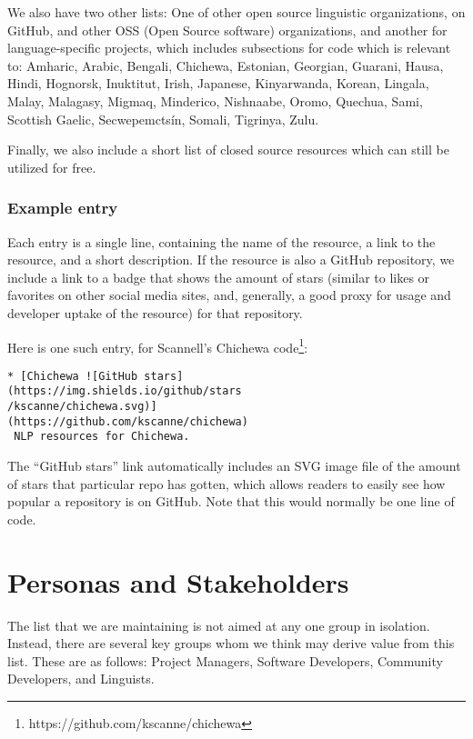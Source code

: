 \documentclass[10pt, a4paper]{article}
\begin{document}
We also have two other lists: One of other open source linguistic organizations, on GitHub, and other OSS (Open Source software) organizations, and another for language-specific projects, which includes subsections for code which is relevant to: Amharic, Arabic, Bengali, Chichewa, Estonian, Georgian, Guarani, Hausa, Hindi, Hognorsk, Inuktitut, Irish, Japanese, Kinyarwanda, Korean, Lingala, Malay, Malagasy, Migmaq, Minderico, Nishnaabe, Oromo, Quechua, Sami, Scottish Gaelic, Secwepemcts\'in, Somali, Tigrinya, Zulu.

Finally, we also include a short list of closed source resources which can still be utilized for free. 

\subsubsection{Example entry}

Each entry is a single line, containing the name of the resource, a link to the resource, and a short description. If the resource is also a GitHub repository, we include a link to a badge that shows the amount of stars (similar to likes or favorites on other social media sites, and, generally, a good proxy for usage and developer uptake of the resource) for that repository.

Here is one such entry, for Scannell's Chichewa code\footnote{https://github.com/kscanne/chichewa}: 

\begin{verbatim}
* [Chichewa ![GitHub stars]
(https://img.shields.io/github/stars
/kscanne/chichewa.svg)]
(https://github.com/kscanne/chichewa)
 NLP resources for Chichewa.
\end{verbatim}

The ``GitHub stars'' link automatically includes an SVG image file of the amount of stars that particular repo has gotten, which allows readers to easily see how popular a repository is on GitHub. Note that this would normally be one line of code.

\section{Personas and Stakeholders}

The list that we are maintaining is not aimed at any one group in isolation. Instead, there are several key groups whom we think may derive value from this list. These are as follows: Project Managers, Software Developers, Community Developers, and  Linguists.
\end{document}
